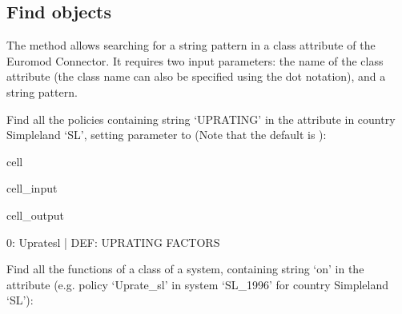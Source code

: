 \documentclass[letterpaper,10pt,english]{sphinxmanual}
\begin{document}
\subsection{Find objects}
\label{\detokenize{userguide:find-objects}}
\sphinxAtStartPar
The method  allows searching for a string pattern in a class attribute of the Euromod Connector. It requires two input parameters: the name of the class attribute (the class name can also be specified using the dot notation), and a string pattern.

\sphinxAtStartPar
Find all the policies containing string ‘UPRATING’ in the attribute  in country Simpleland ‘SL’, setting parameter  to  (Note that the default is ):

\begin{sphinxuseclass}{cell}
\begin{sphinxuseclass}{cell_input}
\begin{sphinxVerbatim}[commandchars=\\\{\}]
\PYG{p}{[}\PYG{p}{]}
\end{sphinxVerbatim}

\end{sphinxuseclass}
\begin{sphinxuseclass}{cell_output}
\begin{sphinxVerbatim}[commandchars=\\\{\}]
0: Uprate\PYGZus{}sl    |    DEF: UPRATING FACTORS 
\end{sphinxVerbatim}

\end{sphinxuseclass}
\end{sphinxuseclass}
\sphinxAtStartPar
Find all the functions of a  class of a system, containing string ‘on’ in the  attribute (e.g. policy ‘Uprate\_sl’ in system ‘SL\_1996’ for country Simpleland ‘SL’):
\end{document}
